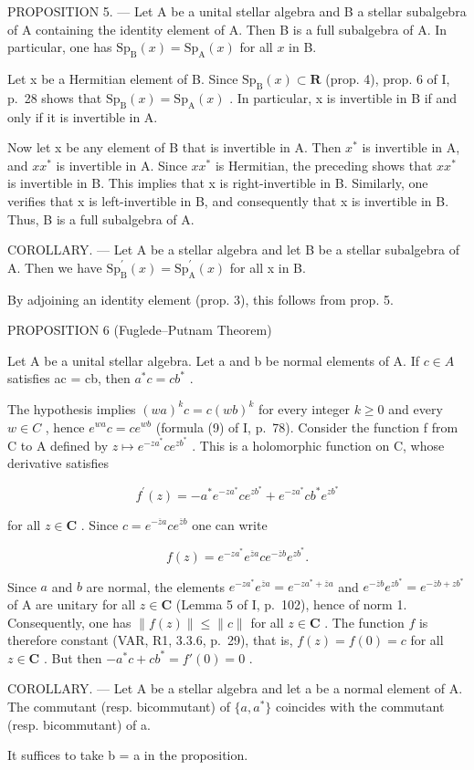 PROPOSITION 5. — Let A be a unital stellar algebra and B a stellar subalgebra of A containing the identity element of A. Then B is a full subalgebra of A. In particular, one has \(\mathrm{Sp}_{\mathrm{B}}(x) = \mathrm{Sp}_{\mathrm{A}}(x)\) for all \(x\) in B.

Let x be a Hermitian element of B. Since \(\mathrm{Sp}_{\mathrm{B}}(x) \subset \mathbf{R}\) (prop. 4), prop. 6 of I, p.~28 shows that \(\mathrm{Sp}_{\mathrm{B}}(x) = \mathrm{Sp}_{\mathrm{A}}(x)\) . In particular, x is invertible in B if and only if it is invertible in A.

Now let x be any element of B that is invertible in A. Then \(x^{*}\) is invertible in A, and \(xx^{*}\) is invertible in A. Since \(xx^{*}\) is Hermitian, the preceding shows that \(xx^{*}\) is invertible in B. This implies that x is right-invertible in B. Similarly, one verifies that x is left-invertible in B, and consequently that x is invertible in B. Thus, B is a full subalgebra of A.

COROLLARY. --- Let A be a stellar algebra and let B be a stellar subalgebra of A. Then we have \(\mathrm{Sp}_{\mathrm{B}}^{\prime}(x)=\mathrm{Sp}_{\mathrm{A}}^{\prime}(x)\) for all x in B.

By adjoining an identity element (prop. 3), this follows from prop. 5.

PROPOSITION 6 (Fuglede–Putnam Theorem)

Let A be a unital stellar algebra. Let a and b be normal elements of A. If \(c \in A\) satisfies ac = cb, then \(a^{*}c = cb^{*}\) .

The hypothesis implies \((wa)^{k}c = c(wb)^{k}\) for every integer \(k \geqslant 0\) and every \(w \in C\) , hence \(e^{wa}c = ce^{wb}\) (formula (9) of I, p.~78). Consider the function f from C to A defined by \(z \mapsto e^{-za^{*}}ce^{zb^{*}}\) . This is a holomorphic function on C, whose derivative satisfies

\[
f ^ {\prime} (z) = - a ^ {*} e ^ {- z a ^ {*}} c e ^ {z b ^ {*}} + e ^ {- z a ^ {*}} c b ^ {*} e ^ {z b ^ {*}}
\]

for all \(z \in \mathbf{C}\) . Since \(c = e^{-\overline{z}a} ce^{\overline{z}b}\) one can write

\[
f (z) = e ^ {- z a ^ {*}} e ^ {\overline {{z}} a} c e ^ {- \overline {{z}} b} e ^ {z b ^ {*}}.
\]

Since \(a\) and \(b\) are normal, the elements \(e^{-za^*}e^{\overline{z} a} = e^{-za^* + \overline{z} a}\) and \(e^{-\overline{z} b}e^{zb^*} = e^{-\overline{z} b + zb^*}\) of A are unitary for all \(z\in \mathbf{C}\) (Lemma 5 of I, p.~102), hence of norm 1. Consequently, one has \(\| f(z)\| \leqslant \| c\|\) for all \(z\in \mathbf{C}\) . The function \(f\) is therefore constant (VAR, R1, 3.3.6, p.~29), that is, \(f(z) = f(0) = c\) for all \(z\in \mathbf{C}\) . But then \(-a^{*}c + cb^{*} = f'(0) = 0\) .

COROLLARY. --- Let A be a stellar algebra and let a be a normal element of A. The commutant (resp. bicommutant) of \(\{a, a^{*}\}\) coincides with the commutant (resp. bicommutant) of a.

It suffices to take b = a in the proposition.

